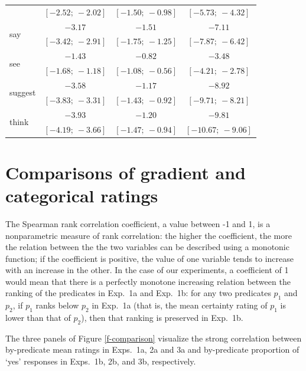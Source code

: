 \documentclass[11pt,fleqn]{article}
\newcommand{\6}{\mbox{$[\hspace*{-.6mm}[$}}
\newcommand{\9}{\mbox{$]\hspace*{-.6mm}]$}}
\begin{document}
\begin{table}
\begin{center}
\begin{tabular}{l c c c}
                         & $[-2.52;\ -2.02]$ & $[-1.50;\ -0.98]$ & $[-5.73;\ -4.32]$   \\
\multirow{2}{*}{say}               & $-3.17$       & $-1.51$       & $-7.11$         \\
                         & $[-3.42;\ -2.91]$ & $[-1.75;\ -1.25]$ & $[-7.87;\ -6.42]$   \\
\multirow{2}{*}{see}               & $-1.43$       & $-0.82$       & $-3.48$         \\
                         & $[-1.68;\ -1.18]$ & $[-1.08;\ -0.56]$ & $[-4.21;\ -2.78]$   \\
\multirow{2}{*}{suggest}           & $-3.58$       & $-1.17$       & $-8.92$         \\
                         & $[-3.83;\ -3.31]$ & $[-1.43;\ -0.92]$ & $[-9.71;\ -8.21]$   \\
\multirow{2}{*}{think}             & $-3.93$       & $-1.20$       & $-9.81$         \\
                         & $[-4.19;\ -3.66]$ & $[-1.47;\ -0.94]$ & $[-10.67;\ -9.06]$  \\
\bottomrule
\end{tabular}
\label{tab:exp3modelresults}
\end{center}
\end{table}

\normalsize


\section{Comparisons of gradient and categorical ratings}\label{a-comparison}

The Spearman rank correlation coefficient, a value between -1 and 1, is a nonparametric measure of rank correlation: the higher the coefficient, the more the relation between the the two variables can be described using a monotonic function; if the coefficient is positive, the value of one variable tends to increase with an increase in the other. In the case of our experiments, a coefficient of 1 would mean that there is a perfectly monotone increasing relation between the ranking of the predicates in Exp.~1a and Exp.~1b: for any two predicates $p_1$ and $p_2$, if $p_1$ ranks below $p_2$ in Exp.~1a (that is, the mean certainty rating of $p_1$ is lower than that of $p_2$), then that ranking is preserved in Exp.~1b.

The three panels of Figure \ref{f-comparison} visualize the strong correlation between by-predicate mean ratings in Exps.~1a, 2a and 3a and by-predicate proportion of `yes' responses in Exps.~1b, 2b, and 3b, respectively.
\end{document}
